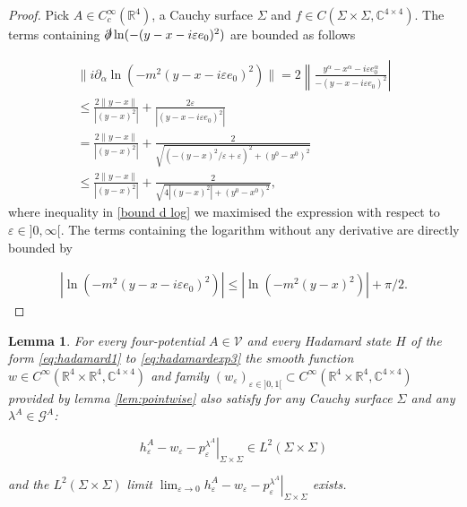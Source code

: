 \documentclass[b5paper,draft,openbib,12pt]{memoir}
\newtheorem{Lemma}[Def]{Lemma}
\begin{document}
\begin{proof}
Pick \(A\in C_c^\infty(\mathbb{R}^4)\), a Cauchy surface \(\Sigma\) and \(f\in C(\Sigma\times\Sigma,\mathbb{C}^{4\times 4})\).
The terms containing \(\slashed{\partial}\ln(-(y-x-i\varepsilon e_0)^2)\) are bounded as follows

\begin{align}
\|i\partial_\alpha\ln(-m^2(y-x-i\varepsilon e_0)^2)\|=2\left\| \frac{y^\alpha-x^\alpha-i\varepsilon e_0^\alpha}{-(y-x-i\varepsilon e_0)^2}\right|\\
\le \frac{2\|y-x\|}{|(y-x)^2|} + \frac{2\varepsilon}{|(y-x-i\varepsilon e_0)^2|}\\
=\frac{2\|y-x\|}{|(y-x)^2|} + \frac{2}{\sqrt{(-(y-x)^2/\varepsilon + \varepsilon)^2 +(y^0-x^0)^2}}\\\label{bound d log}
\le \frac{2\|y-x\|}{|(y-x)^2|} + \frac{2}{\sqrt{4|(y-x)^2| + (y^0-x^0)^2}}, 
\end{align}
where inequality  in \eqref{bound d log} we maximised the expression with respect to \(\varepsilon \in ]0,\infty[\). 
The terms containing the logarithm without
any derivative are directly bounded by

\begin{align}\nonumber
|\ln(-m^2(y-x-i\varepsilon e_0)^2)|\le |\ln(-m^2(y-x)^2)| +\pi/2.
\end{align}
\end{proof}



\begin{Lemma}\label{lem:Hadamard=>Pol}
For every four-potential \(A\in \mathcal{V}\) and every Hadamard
state \(H\) of the form \eqref{eq:hadamard1} to \eqref{eq:hadamardexp3} the  
smooth function \(w\in C^\infty(\mathbb{R}^4\times 
\mathbb{R}^4,\mathbb{C}^{4\times 4})\) and family 
\((w_\varepsilon)_{\varepsilon \in ]0,1[ }
\subset C^\infty(\mathbb{R}^4\times \mathbb{R}^4,\mathbb{C}^{4\times4})\) 
provided by lemma \ref{lem:pointwise} also satisfy for any
Cauchy surface \(\Sigma\) and any \(\lambda^A\in\mathcal{G}^A\):

\begin{equation}
\left.h_\varepsilon^A-w_\varepsilon-p^{\lambda^A}_\varepsilon \right|_{\Sigma\times\Sigma} \in L^2(\Sigma\times\Sigma)
\end{equation}

and the \(L^2(\Sigma\times\Sigma)\) limit \(\lim_{\varepsilon\rightarrow 0} \left.h_\varepsilon^A-w_\varepsilon-p^{\lambda^A}_\varepsilon \right|_{\Sigma\times\Sigma}\) exists.
\end{Lemma}
\end{document}
